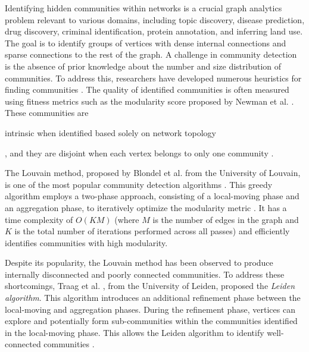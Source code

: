 Identifying hidden communities within networks is a crucial graph analytics problem relevant to various domains, including topic discovery, disease prediction, drug discovery, criminal identification, protein annotation, and inferring land use. The goal is to identify groups of vertices with dense internal connections and sparse connections to the rest of the graph. A challenge in community detection is the absence of prior knowledge about the number and size distribution of communities. To address this, researchers have developed numerous heuristics for finding communities \cite{com-guimera05, com-derenyi05, com-newman06, com-reichardt06, com-raghavan07, com-blondel08, com-rosvall08, infomap-rosvall09, com-fortunato10, com-gregory10, com-kloster14, com-come15, com-ruan15, com-newman16, com-ghoshal19, com-rita20, com-lu20, com-gupta22}. The quality of identified communities is often measured using fitness metrics such as the modularity score proposed by Newman et al. \cite{com-newman06}. These communities are intrinsic when identified based solely on network topology, and they are disjoint when each vertex belongs to only one community \cite{com-gregory10}.

The Louvain method, proposed by Blondel et al. \cite{com-blondel08} from the University of Louvain, is one of the most popular community detection algorithms \cite{com-lancichinetti09}. This greedy algorithm employs a two-phase approach, consisting of a local-moving phase and an aggregation phase, to iteratively optimize the modularity metric \cite{com-blondel08}. It has a time complexity of $O(KM)$ (where $M$ is the number of edges in the graph and $K$ is the total number of iterations performed across all passes) and efficiently identifies communities with high modularity.

Despite its popularity, the Louvain method has been observed to produce internally disconnected and poorly connected communities. To address these shortcomings, Traag et al. \cite{com-traag19}, from the University of Leiden, proposed the \textit{Leiden algorithm}. This algorithm introduces an additional refinement phase between the local-moving and aggregation phases. During the refinement phase, vertices can explore and potentially form sub-communities within the communities identified in the local-moving phase. This allows the Leiden algorithm to identify well-connected communities \cite{com-traag19}.

